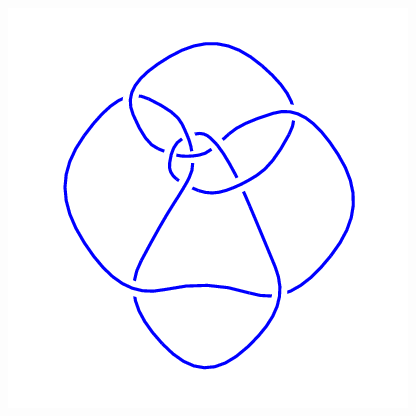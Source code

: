 \begin{figure}[H]
\begin{minipage}[b]{.18\linewidth}
	\end{minipage}
	\begin{minipage}[b]{.18\linewidth}
		\centering
		\includegraphics[width=\linewidth]{../data/10_121.png}
	\end{minipage}
\end{figure}
